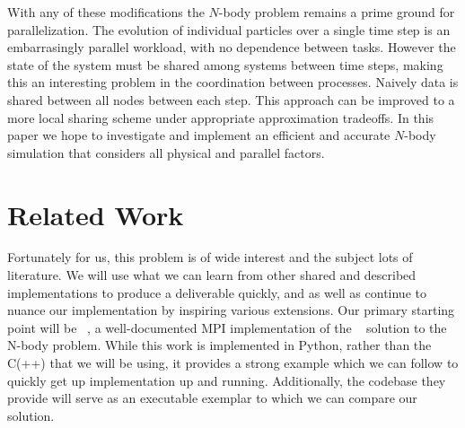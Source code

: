 \documentclass[11pt]{article}
\begin{document}
With any of these modifications the $N$-body problem remains a prime ground for parallelization. The evolution of individual particles over a single time step is an embarrasingly parallel workload, with no dependence between tasks. However the state of the system must be shared among systems between time steps, making this an interesting problem in the coordination between processes. Naively data is shared between all nodes between each step. This approach can be improved to a more local sharing scheme under appropriate approximation tradeoffs. In this paper we hope to investigate and implement an efficient and accurate $N$-body simulation that considers all physical and parallel factors.


\section {Related Work}\label{rel}
Fortunately for us, this problem is of wide interest and the subject lots of literature.
We will use what we can learn from other shared and described implementations
to produce a deliverable quickly, and as well as continue to nuance our 
implementation by inspiring various extensions.
Our primary starting point will be ~\cite{Harvard_205}, a well-documented
MPI implementation of the ~\cite{barnes-hut} solution to the N-body problem.
While this work is implemented in Python, rather than the C(++) that we will
be using, it provides a strong example which we can follow to quickly
get up implementation up and running. Additionally, the codebase they
provide will serve as an executable exemplar to which we can compare our solution.
\end{document}
